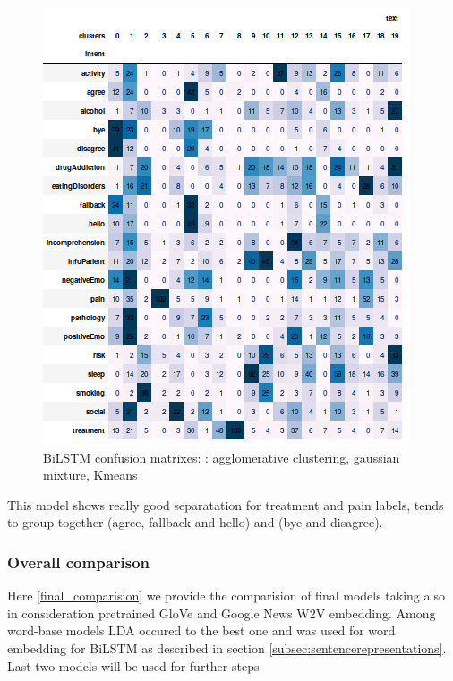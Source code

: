 \documentclass[11pt]{article}
\begin{document}
\begin{figure}[h]
	\includegraphics[scale=0.28]{bilstm_km_cm.png}
	\caption{BiLSTM confusion matrixes: : agglomerative clustering, gaussian mixture, Kmeans}
\label{lda_gm_cm}
\end{figure}
\FloatBarrier

This model shows really good separatation for treatment and pain labels, 
tends to group together (agree, fallback and hello) and (bye and disagree).

\subsubsection{Overall comparison}

Here \ref{final_comparision} we provide the comparision of final models taking also in consideration pretrained GloVe and Google News W2V embedding. Among word-base models LDA occured to the best one and was used for word embedding for BiLSTM as described in section \ref{subsec:sentencerepresentations}. Last two models will be used for further steps.
\end{document}

